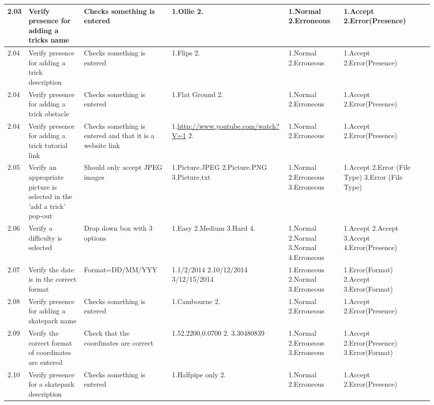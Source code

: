 \begin{landscape}
\begin{center}
\begin{longtable}{|p{1.5cm}|p{2.5cm}|p{2.5cm}|p{2cm}|p{2cm}|p{2cm}|p{2cm}|p{2cm}|}
2.03 & Verify presence for adding a tricks name & Checks something is entered & 1.Ollie 2.  & 1.Normal 2.Erroneous & 1.Accept 2.Error(Presence) & & \\ \hline

2.04 & Verify presence for adding a trick description & Checks something is entered & 1.Flips 2. & 1.Normal 2.Erroneous & 1.Accept 2.Error(Presence) & & \\ \hline

2.04 & Verify presence for adding a trick obstacle & Checks something is entered & 1.Flat Ground 2. & 1.Normal 2.Erroneous & 1.Accept 2.Error(Presence) & & \\ \hline

2.04 & Verify presence for adding a trick tutorial link & Checks something is entered and that it is a website link & 1.\url{http://www.youtube.com/watch?V=1} 2. & 1.Normal 2.Erroneous & 1.Accept 2.Error(Presence) & & \\ \hline

2.05 & Verify an appropriate picture is selected in the 'add a trick' pop-out & Should only accept JPEG images & 1.Picture.JPEG 2.Picture.PNG 3.Picture.txt & 1.Normal 2.Erroneous 3.Erroneous & 1.Accept 2.Error (File Type) 3.Error (File Type) & & \\ \hline

2.06 & Verify a difficulty is selected & Drop down box with 3 options & 1.Easy 2.Medium 3.Hard 4. & 1.Normal 2.Normal 3.Normal 4.Erroneous & 1.Accept 2.Accept 3.Accept 4.Error(Presence) & & \\ \hline

2.07 & Verify the date is in the correct format & Format=DD/MM/YYY & 1.1/2/2014 2.10/12/2014 3/12/15/2014 & 1.Erroneous 2.Normal 3.Erroneous & 1.Error(Format) 2.Accept 3.Error(Format) & & \\ \hline 

2.08 & Verify presence for adding a skatepark name & Checks something is entered & 1.Cambourne 2.  & 1.Normal 2.Erroneous & 1.Accept 2.Error(Presence) & & \\ \hline 

2.09 & Verify the correct format of coordinates are entered & Check that the coordinates are correct & 1.52.2200,0.0700 2.  3.30480839 & 1.Normal 2.Erroneous 3.Erroneous & 1.Accept 2.Error(Presence) 3.Error(Format) & & \\ \hline

2.10 & Verify presence for a skatepark description & Checks something is entered & 1.Halfpipe only 2.  & 1.Normal 2.Erroneous & 1.Accept 2.Error(Presence) & & \\ \hline


\end{longtable}
\end{center}
\end{landscape}
